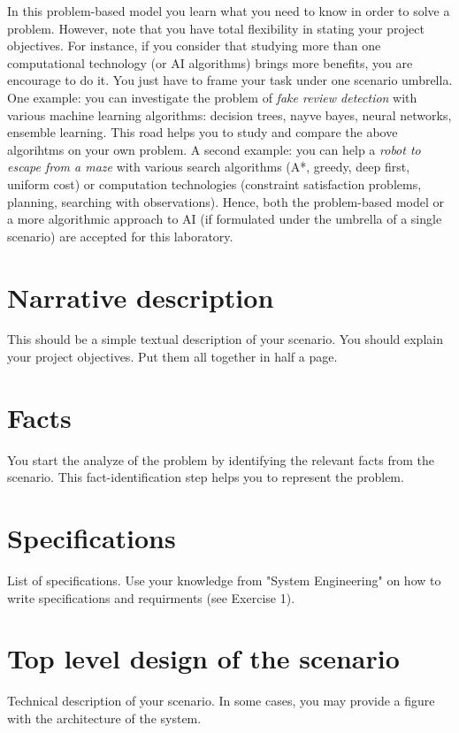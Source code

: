\documentclass[a4paper,12pt]{report}
\begin{document}
In this problem-based model you learn what you 
need to know in order to solve a problem. 
However, note that you have total flexibility in stating your project objectives.
For instance, if you consider that studying more 
than one computational technology (or AI algorithms) brings more benefits, 
you are encourage to do it. 
You just have to frame your task under one scenario umbrella. 
One example: you can investigate the problem of {\it fake review detection} with 
various machine learning algorithms: decision trees, nayve bayes, neural networks, ensemble learning. 
This road helps you to study and compare the above algorihtms on your own problem.
A second example: you can help a {\it robot to escape from a maze} 
with various search algorithms (A*, greedy, deep first, uniform cost) 
or computation technologies (constraint satisfaction problems, planning, 
searching with observations).
Hence, both the problem-based model or a more algorithmic approach to AI 
(if formulated under the umbrella of a single scenario) 
are accepted for this laboratory.



\section{Narrative description}
This should be a simple textual description of your scenario.
You should explain your project objectives.
Put them all together in half a page.

\section{Facts}
You start the analyze of the problem by identifying 
the relevant facts from the scenario.
This fact-identification step helps you to represent the problem.


\section{Specifications}
List of specifications. 
Use your knowledge from "System Engineering" on how to write specifications and requirments (see Exercise 1).

\section{Top level design of the scenario}
Technical description of your scenario. 
In some cases, you may provide a figure with the architecture of the system. 
\end{document}
